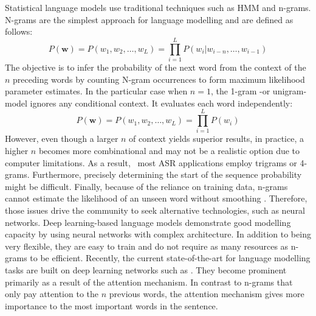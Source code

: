 Statistical language models use traditional techniques such as HMM and n-grams. N-grams are the simplest approach for language modelling and are defined as follows:
\begin{equation}
    P(\boldsymbol{w})= P(w_1 , w_2 ,\dots,w_L)  =\prod_{i=1}^L P(w_i| w_{i-n} , \dots,w_{i-1}  )
\end{equation}
The objective is to infer the probability of the next word from the context of the $n$ preceding words by counting N-gram occurrences to form maximum likelihood parameter estimates.
In the particular case when $n=1$, the 1-gram -or unigram- model ignores any conditional context. It evaluates each word independently:
\begin{equation}
    P(\boldsymbol{w})=P(w_1, w_2,\dots,w_L )  = \prod_{i=1}^L P(w_i)
\end{equation}
However, even though a larger $n$ of context yields superior results, in practice, a higher $n$ becomes more combinational and may not be a realistic option due to computer limitations. As a result,  most ASR applications employ trigrams or 4-grams. Furthermore, precisely determining the start of the sequence probability might be difficult. Finally, because of the reliance on training data, n-grams cannot estimate the likelihood of an unseen word without smoothing \cite{n-grams-smoothing}. Therefore, those issues drive the community to seek alternative technologies, such as neural networks.
Deep learning-based language models demonstrate good modelling capacity by using neural networks with complex architecture. In addition to being very flexible, they are easy to train and do not require as many resources as n-grams to be efficient. Recently, the current state-of-the-art for language modelling tasks are built on deep learning networks such as \cite{Bert}. They become prominent primarily as a result of the attention mechanism. In contrast to n-grams that only pay attention to the $n$ previous words, the attention mechanism gives more importance to the most important words in the sentence.

